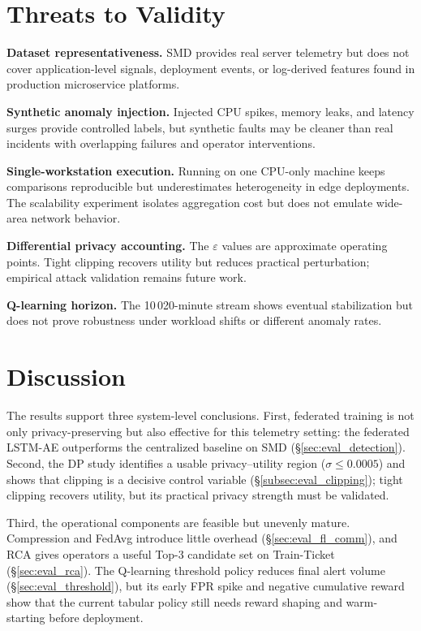 \section{Threats to Validity}
\label{sec:eval_validity}

\textbf{Dataset representativeness.} SMD provides real server telemetry but
does not cover application-level signals, deployment events, or log-derived
features found in production microservice platforms.

\textbf{Synthetic anomaly injection.} Injected CPU spikes, memory leaks, and
latency surges provide controlled labels, but synthetic faults may be cleaner
than real incidents with overlapping failures and operator interventions.

\textbf{Single-workstation execution.} Running on one CPU-only machine keeps
comparisons reproducible but underestimates heterogeneity in edge deployments.
The scalability experiment isolates aggregation cost but does not emulate
wide-area network behavior.

\textbf{Differential privacy accounting.} The $\varepsilon$ values are
approximate operating points. Tight clipping recovers utility but reduces
practical perturbation; empirical attack validation remains future work.

\textbf{Q-learning horizon.} The 10\,020-minute stream shows eventual
stabilization but does not prove robustness under workload shifts or
different anomaly rates.

\section{Discussion}
\label{sec:eval_discussion}

The results support three system-level conclusions. First, federated training is
not only privacy-preserving but also effective for this telemetry setting: the
federated LSTM-AE outperforms the centralized baseline on SMD
(\S\ref{sec:eval_detection}). Second, the DP study identifies a usable
privacy--utility region ($\sigma \leq 0.0005$) and shows that clipping is a
decisive control variable (\S\ref{subsec:eval_clipping}); tight clipping
recovers utility, but its practical privacy strength must be validated.

Third, the operational components are feasible but unevenly mature. Compression
and FedAvg introduce little overhead (\S\ref{sec:eval_fl_comm}), and RCA gives
operators a useful Top-3 candidate set on Train-Ticket
(\S\ref{sec:eval_rca}). The Q-learning threshold policy reduces final alert
volume (\S\ref{sec:eval_threshold}), but its early FPR spike and negative
cumulative reward show that the current tabular policy still needs reward
shaping and warm-starting before deployment.

